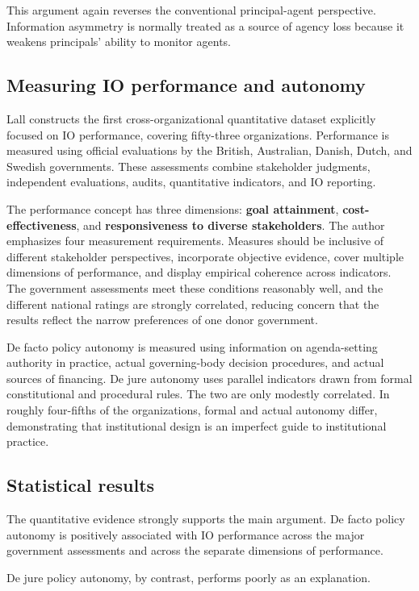 This argument again reverses the conventional principal-agent perspective. Information asymmetry is normally treated as a source of agency loss because it weakens principals' ability to monitor agents.

\subsection{Measuring IO performance and autonomy}

Lall constructs the first cross-organizational quantitative dataset explicitly focused on IO performance, covering fifty-three organizations. Performance is measured using official evaluations by the British, Australian, Danish, Dutch, and Swedish governments. These assessments combine stakeholder judgments, independent evaluations, audits, quantitative indicators, and IO reporting.

The performance concept has three dimensions: \textbf{goal attainment}, \textbf{cost-effectiveness}, and \textbf{responsiveness to diverse stakeholders}. The author emphasizes four measurement requirements. Measures should be inclusive of different stakeholder perspectives, incorporate objective evidence, cover multiple dimensions of performance, and display empirical coherence across indicators. The government assessments meet these conditions reasonably well, and the different national ratings are strongly correlated, reducing concern that the results reflect the narrow preferences of one donor government.

De facto policy autonomy is measured using information on agenda-setting authority in practice, actual governing-body decision procedures, and actual sources of financing. De jure autonomy uses parallel indicators drawn from formal constitutional and procedural rules. The two are only modestly correlated. In roughly four-fifths of the organizations, formal and actual autonomy differ, demonstrating that institutional design is an imperfect guide to institutional practice.

\subsection{Statistical results}

The quantitative evidence strongly supports the main argument. De facto policy autonomy is positively associated with IO performance across the major government assessments and across the separate dimensions of performance.

De jure policy autonomy, by contrast, performs poorly as an explanation.

